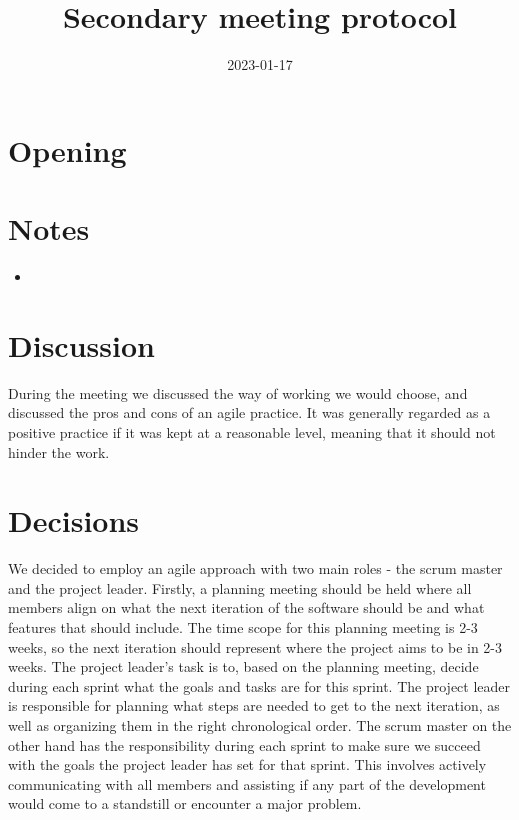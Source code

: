 \documentclass{article}
\newcommand{\meetingdate}{2023-01-17}
\newcommand{\meetingtime}{15:00}
\newcommand{\meetingplace}{EG2516}
\newcommand{\meetingtitle}{Secondary meeting protocol}
\newcommand{\attendees}{\members}
\begin{document}
    \begin{titlepage}
        \title{\meetingtitle}
        \date{\meetingdate}
        \maketitle
        
        \thispagestyle{first}
        
        \timeanddate{\meetingdate \space \meetingtime}
        \place{\meetingplace}
        \called{\members}
        \attended{\attendees}
    \end{titlepage}
    \newpage
    \pagestyle{fancy}

    \section{Opening}
        

    \section{Notes}
        \begin{itemize}
            \item 
        \end{itemize}

    \section{Discussion}
        During the meeting we discussed the way of working we would choose, and discussed the pros and cons of an agile practice. It was generally regarded as a positive practice if it was kept at a reasonable level, meaning that it should not hinder the work. 

    \section{Decisions}
        We decided to employ an agile approach with two main roles - the scrum master and the project leader. Firstly, a planning meeting should be held where all members align on what the next iteration of the software should be and what features that should include. The time scope for this planning meeting is 2-3 weeks, so the next iteration should represent where the project aims to be in 2-3 weeks. The project leader's task is to, based on the planning meeting, decide during each sprint what the goals and tasks are for this sprint. The project leader is responsible for planning what steps are needed to get to the next iteration, as well as organizing them in the right chronological order. The scrum master on the other hand has the responsibility during each sprint to make sure we succeed with the goals the project leader has set for that sprint. This involves actively communicating with all members and assisting if any part of the development would come to a standstill or encounter a major problem.
\end{document}
